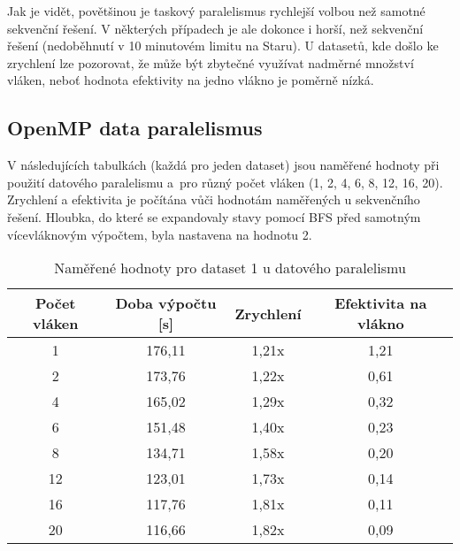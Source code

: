 \documentclass[a4paper,10pt]{article}
\begin{document}
Jak je vidět, povětšinou je taskový paralelismus rychlejší volbou než samotné sekvenční řešení. V některých případech je ale dokonce i horší, než sekvenční řešení (nedoběhnutí v 10 minutovém limitu na Staru). U datasetů, kde došlo ke zrychlení lze pozorovat, že může být zbytečné využívat nadměrné množství vláken, neboť hodnota efektivity na jedno vlákno je poměrně nízká.

\subsection*{OpenMP data paralelismus}
V následujících tabulkách (každá pro jeden dataset) jsou naměřené hodnoty při použití datového paralelismu a~pro různý počet vláken (1, 2, 4, 6, 8, 12, 16, 20). Zrychlení a efektivita je počítána vůči hodnotám naměřených u sekvenčního řešení. Hloubka, do které se expandovaly stavy pomocí BFS před samotným vícevláknovým výpočtem, byla nastavena na hodnotu 2.

\begin{table}[H]
\centering
\begin{tabular}{|c|c|c|c|}
\hline
Počet vláken & Doba výpočtu {[}s{]} & Zrychlení & Efektivita na vlákno \\ \hline
1            & 176,11               & 1,21x     & 1,21                 \\
2            & 173,76               & 1,22x     & 0,61                 \\
4            & 165,02               & 1,29x     & 0,32                 \\
6            & 151,48               & 1,40x     & 0,23                 \\
8            & 134,71               & 1,58x     & 0,20                 \\
12           & 123,01               & 1,73x     & 0,14                 \\
16           & 117,76               & 1,81x     & 0,11                 \\
20           & 116,66               & 1,82x     & 0,09                 \\ \hline
\end{tabular}
\caption{Naměřené hodnoty pro dataset 1 u datového paralelismu}
\end{table}
\end{document}

